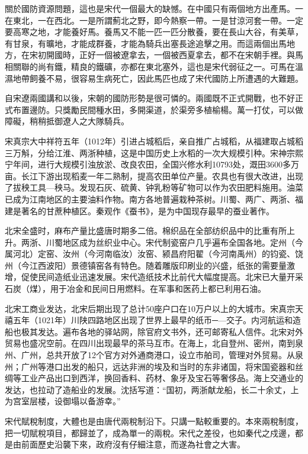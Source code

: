 關於國防資源問題，這也是宋代一個最大的缺憾。在中國只有兩個地方出產馬。一在東北，一在西北。一是所謂薊北之野，即今熱察一帶。一是甘涼河套一帶。一定要高寒之地，才能養好馬。養馬又不能一匹一匹分散養，要在長山大谷，有美草，有甘泉，有曠地，才能成群養，才能為騎兵出塞長途追擊之用。而這兩個出馬地方，在宋初開國時，正好一個被遼拿去，一個被西夏拿去，都不在宋朝手裡。與馬相關聯的尚有鐵，精良的鐵礦，亦都在東北塞外，這也是宋代弱征之一。可馬在溫濕地帶飼養不易，很容易生病死亡，因此馬匹也成了宋代國防上所遭遇的大難題。

自宋遼兩國講和以後，宋朝的國防形勢是很可憐的。兩國既不正式開戰，也不好正式布置邊防。只獎勵民間種水田，多開渠道，於渠旁多植榆楊。萬一打仗，可以做障礙，稍稍抵御遼人之大隊騎兵。

宋真宗大中祥符五年（1012年）引进占城稻后，亲自推广占城稻，从福建取占城稻三万斛，分给江淮、两浙种植，这是中国历史上水稻的一次大规模引种。宋神宗熙宁年间，进行大规模引浊放淤、改良农田，全国兴修水利10793处，溉田3600多万亩。长江下游出现稻麦一年二熟制，提高农田单位产量。农具也有很大改进，出现了拔秧工具—秧马。发现石灰、硫黄、钟乳粉等矿物可以作为农田肥料施用。油菜已成为江南地区的主要油料作物。南方各地普遍栽种茶树。川蜀、两广、两浙、福建是著名的甘蔗种植区。秦观作《蚕书》，是为中国现存最早的蚕业著作。

北宋全盛时，麻布产量比盛唐时期多二倍。棉织品在全部纺织品中的比重有所上升。两浙、川蜀地区成为丝织业中心。宋代制瓷窑户几乎遍布全国各地。定州（今属河北）定窑、汝州（今河南临汝）汝窑、颍昌府阳翟（今河南禹州）的钧瓷、饶州（今江西波阳）景德镇窑各有特色。随着雕版印刷业的兴盛，纸张的需要量激增，促使民间造纸业迅速发展。宋代造纸技术比前代大幅度提高。北宋已大量开采石炭（煤），用于冶金和民间日用燃料。在军事和医药上都已利用石油。

北宋工商业发达，北宋后期出现了总计50座户口在10万户以上的大城市。宋真宗天禧五年（1021年）川陕四路地区出现了世界上最早的纸币─—交子。内河航运和造船也极其发达。遍布各地的驿站网，除官府文书外，还可邮寄私人信件。北宋对外贸易也盛况空前。在四川出现最早的茶马互市。在海上，北自登州、密州，南到泉州、广州，总共开放了12个官方对外通商港口，设立市舶司，管理对外贸易。从泉州；广州等港口出发的船只，远达非洲的埃及和当时的东非诸国，将宋国瓷器和丝绸等工业产品出口到西洋，换回香料、药材、象牙及宝石等奢侈品。海上交通业的发达，也拉动了造船业的发展。沈括写道：“国初，两浙献龙船，长二十余丈，上为宫室层楼，设御塌以备游幸。”

宋代賦稅制度，大體也是由唐代兩稅制沿下。只講一點較重要的。本來兩稅制度，把一切賦稅項目，都歸並了，成為單一的兩稅。宋代之差役，也如秦代之戍邊，都是由前面歷史沿襲下來，政府沒有仔細注意，而遂為社會之大害。

